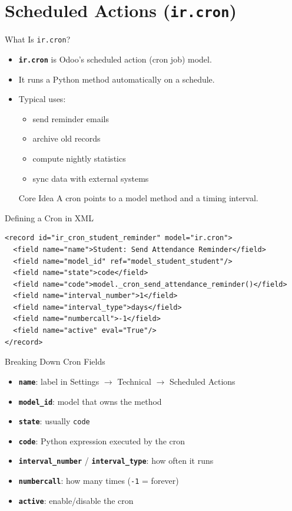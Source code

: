 \section{Scheduled Actions (\texttt{ir.cron})}


\begin{frame}[fragile]{What Is \texttt{ir.cron}?}
	\begin{itemize}
		\item \textbf{\texttt{ir.cron}} is Odoo's scheduled action (cron job) model.
		\item It runs a Python method automatically on a schedule.
		\item Typical uses:
		\begin{itemize}
			\item send reminder emails
			\item archive old records
			\item compute nightly statistics
			\item sync data with external systems
		\end{itemize}
\begin{block}{Core Idea}
	A cron points to a model method and a timing interval.
\end{block}
	\end{itemize}
\end{frame}

\begin{frame}[fragile]{Defining a Cron in XML}
\begin{lstlisting}[style=xml]
<record id="ir_cron_student_reminder" model="ir.cron">
  <field name="name">Student: Send Attendance Reminder</field>
  <field name="model_id" ref="model_student_student"/>
  <field name="state">code</field>
  <field name="code">model._cron_send_attendance_reminder()</field>
  <field name="interval_number">1</field>
  <field name="interval_type">days</field>
  <field name="numbercall">-1</field>
  <field name="active" eval="True"/>
</record>
\end{lstlisting}
\end{frame}

\begin{frame}[fragile]{Breaking Down Cron Fields}
	\begin{itemize}
		\item \textbf{\texttt{name}}: label in Settings $\rightarrow$ Technical $\rightarrow$ Scheduled Actions
		\item \textbf{\texttt{model\_id}}: model that owns the method
		\item \textbf{\texttt{state}}: usually \texttt{code}
		\item \textbf{\texttt{code}}: Python expression executed by the cron
		\item \textbf{\texttt{interval\_number}} / \textbf{\texttt{interval\_type}}: how often it runs
		\item \textbf{\texttt{numbercall}}: how many times (\texttt{-1} = forever)
		\item \textbf{\texttt{active}}: enable/disable the cron
	\end{itemize}
\end{frame}


